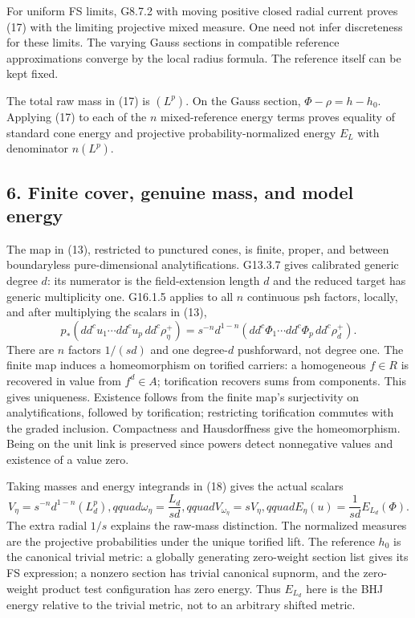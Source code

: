 \documentclass[
  11pt,
]{article}
\begin{document}
For uniform FS limits, G8.7.2 with moving positive closed radial current
proves (17) with the limiting projective mixed measure. One need not
infer discreteness for these limits. The varying Gauss sections in
compatible reference approximations converge by the local radius
formula. The reference itself can be kept fixed.

The total raw mass in (17) is \((L^p)\). On the Gauss section,
\(\Phi-\rho=h-h_0\). Applying (17) to each of the \(n\) mixed-reference
energy terms proves equality of standard cone energy and projective
probability-normalized energy \(E_L\) with denominator \(n(L^p)\).

\subsection{6. Finite cover, genuine mass, and model
energy}\label{finite-cover-genuine-mass-and-model-energy}

The map in (13), restricted to punctured cones, is finite, proper, and
between boundaryless pure-dimensional analytifications. G13.3.7 gives
calibrated generic degree \(d\): its numerator is the field-extension
length \(d\) and the reduced target has generic multiplicity one.
G16.1.5 applies to all \(n\) continuous psh factors, locally, and after
multiplying the scalars in (13),
\[ p_*\left(dd^cu_1\cdots dd^cu_p\,dd^c\rho_\eta^+\right)
       =s^{-n}d^{1-n}\left(dd^c\Phi_1\cdots dd^c\Phi_p\,dd^c\rho_d^+\right). \tag{18}\]
There are \(n\) factors \(1/(sd)\) and one degree-\(d\) pushforward, not
degree one. The finite map induces a homeomorphism on torified carriers:
a homogeneous \(f\in R\) is recovered in value from \(f^d\in A\);
torification recovers sums from components. This gives uniqueness.
Existence follows from the finite map's surjectivity on
analytifications, followed by torification; restricting torification
commutes with the graded inclusion. Compactness and Hausdorffness give
the homeomorphism. Being on the unit link is preserved since powers
detect nonnegative values and existence of a value zero.

Taking masses and energy integrands in (18) gives the actual scalars
\[ V_\eta=s^{-n}d^{1-n}(L_d^p),qquad \omega_\eta=\frac{L_d}{sd},qquad
 V_{\omega_\eta}=sV_\eta,qquad
 E_\eta(u)=\frac1{sd}E_{L_d}(\Phi).                                     \tag{19}\]
The extra radial \(1/s\) explains the raw-mass distinction. The
normalized measures are the projective probabilities under the unique
torified lift. The reference \(h_0\) is the canonical trivial metric: a
globally generating zero-weight section list gives its FS expression; a
nonzero section has trivial canonical supnorm, and the zero-weight
product test configuration has zero energy. Thus \(E_{L_d}\) here is the
BHJ energy relative to the trivial metric, not to an arbitrary shifted
metric.
\end{document}

